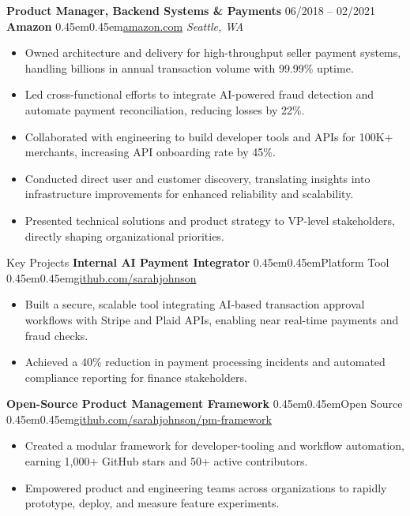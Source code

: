 \documentclass[10pt, letterpaper]{article}
\makeatletter
\renewcommand{\section}{%
  \@startsection{section}{1}{\z@}{10pt}{6pt}{%
    \Large\bfseries\color{black}%
  }%
}
\newcommand{\bull}{\kern0.45em\textbullet\kern0.45em}
\newcommand{\role}[1]{\textbf{#1}}
\newcommand{\org}[1]{\textbf{#1}}
\newcommand{\place}[1]{\textit{#1}}
\makeatother
\begin{document}
\role{Product Manager, Backend Systems \& Payments} \hfill 06/2018 -- 02/2021 \\
\org{Amazon} \bull \href{https://amazon.com}{amazon.com} \hfill \place{Seattle, WA}
\begin{itemize}
  \item Owned architecture and delivery for high-throughput seller payment systems, handling billions in annual transaction volume with 99.99\% uptime.
  \item Led cross-functional efforts to integrate AI-powered fraud detection and automate payment reconciliation, reducing losses by 22\%.
  \item Collaborated with engineering to build developer tools and APIs for 100K+ merchants, increasing API onboarding rate by 45\%.
  \item Conducted direct user and customer discovery, translating insights into infrastructure improvements for enhanced reliability and scalability.
  \item Presented technical solutions and product strategy to VP-level stakeholders, directly shaping organizational priorities.
\end{itemize}
\vspace{12pt}

\section{Key Projects}
\org{Internal AI Payment Integrator} \bull Platform Tool \bull \href{https://github.com/sarahjohnson}{github.com/sarahjohnson}
\begin{itemize}
  \item Built a secure, scalable tool integrating AI-based transaction approval workflows with Stripe and Plaid APIs, enabling near real-time payments and fraud checks.
  \item Achieved a 40\% reduction in payment processing incidents and automated compliance reporting for finance stakeholders.
\end{itemize}
\vspace{6pt}

\org{Open-Source Product Management Framework} \bull Open Source \bull \href{https://github.com/sarahjohnson/pm-framework}{github.com/sarahjohnson/pm-framework}
\begin{itemize}
  \item Created a modular framework for developer-tooling and workflow automation, earning 1,000+ GitHub stars and 50+ active contributors.
  \item Empowered product and engineering teams across organizations to rapidly prototype, deploy, and measure feature experiments.
\end{itemize}
\end{document}
